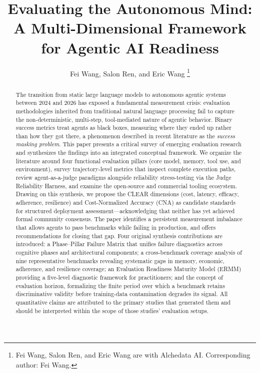 \documentclass[11pt]{article}
\begin{document}
\title{Evaluating the Autonomous Mind: A Multi-Dimensional Framework for Agentic AI Readiness}

\author{Fei Wang, Salon Ren, and Eric Wang%
\thanks{Fei Wang, Salon Ren, and Eric Wang are with Alchedata AI. Corresponding author: Fei Wang.}}

\date{}

\maketitle

\begin{abstract}
The transition from static large language models to autonomous agentic systems between 2024 and 2026 has exposed a fundamental measurement crisis: evaluation methodologies inherited from traditional natural language processing fail to capture the non-deterministic, multi-step, tool-mediated nature of agentic behavior. Binary success metrics treat agents as black boxes, measuring where they ended up rather than how they got there, a phenomenon described in recent literature as the \emph{success masking problem}. This paper presents a critical survey of emerging evaluation research and synthesizes the findings into an integrated conceptual framework. We organize the literature around four functional evaluation pillars (core model, memory, tool use, and environment), survey trajectory-level metrics that inspect complete execution paths, review agent-as-a-judge paradigms alongside reliability stress-testing via the Judge Reliability Harness, and examine the open-source and commercial tooling ecosystem. Drawing on this synthesis, we propose the CLEAR dimensions (cost, latency, efficacy, adherence, resilience) and Cost-Normalized Accuracy (CNA) as candidate standards for structured deployment assessment---acknowledging that neither has yet achieved formal community consensus. The paper identifies a persistent measurement imbalance that allows agents to pass benchmarks while failing in production, and offers recommendations for closing that gap. Four original synthesis contributions are introduced: a Phase--Pillar Failure Matrix that unifies failure diagnostics across cognitive phases and architectural components; a cross-benchmark coverage analysis of nine representative benchmarks revealing systematic gaps in memory, economic, adherence, and resilience coverage; an Evaluation Readiness Maturity Model (ERMM) providing a five-level diagnostic framework for practitioners; and the concept of evaluation horizon, formalizing the finite period over which a benchmark retains discriminative validity before training-data contamination degrades its signal. All quantitative claims are attributed to the primary studies that generated them and should be interpreted within the scope of those studies' evaluation setups.
\end{abstract}
\end{document}
